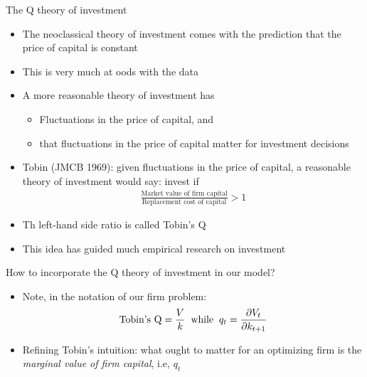 \documentclass[9pt,xcolor={dvipsnames}]{beamer}
\newcommand{\bit}{\begin{itemize}}
\newcommand{\eit}{\end{itemize}}
\newcommand{\bc}{\color{blue}}
\begin{document}
\begin{frame}{The Q theory of investment}

\bit
\setlength\itemsep{1em}
\item The neoclassical theory of investment comes with the prediction that the price of capital is constant

\item This is very much at oods with the data

\item A more reasonable theory of investment has
\bit
	\item Fluctuations in the price of capital, and
	
	\item that fluctuations in the price of capital matter for investment decisions
\eit

\item Tobin (JMCB 1969): given fluctuations in the price of capital, a reasonable theory of investment would say: invest if  
\begin{eqnarray}
\frac{\text{Market value of firm capital}}{\text{Replacement cost of capital}} >1\nonumber 
\end{eqnarray}

\item Th left-hand side ratio is called {\bc Tobin's Q}

\item This idea has guided much empirical research on investment



\eit

\end{frame}



\begin{frame}{How to incorporate the Q theory of investment in our model?}

	\bit
	\setlength\itemsep{1em}	
	\item Note, in the notation of our firm problem:
	\begin{eqnarray}
	\text{Tobin's Q} = \frac{V}{k} \hspace{2mm} \text{while} \hspace{2mm} q_t = \frac{\partial V_t}{\partial k_{t+1}} \nonumber
	\end{eqnarray}
	
	\item Refining Tobin's intuition: what ought to matter for an optimizing firm is the \emph{marginal value of firm capital}, i.e, $q_t$
	
	\eit
	
	\end{frame}
\end{document}
